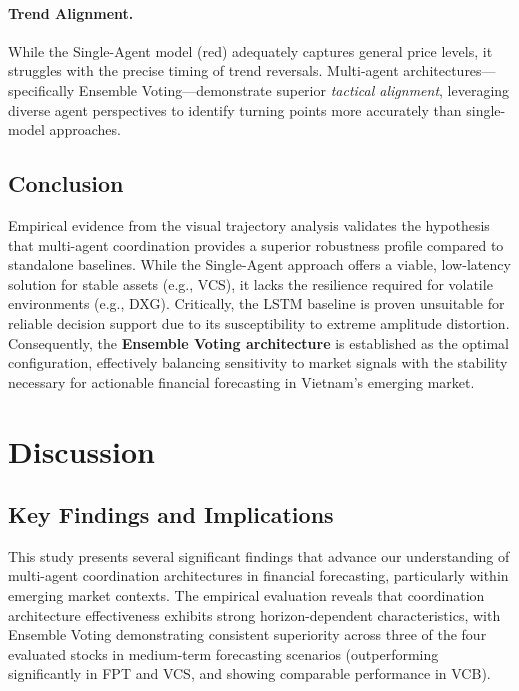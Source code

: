\documentclass{ieeeaccess}
\begin{document}
\paragraph{Trend Alignment.}
While the Single-Agent model (red) adequately captures general price levels, it struggles with the precise timing of trend reversals. Multi-agent architectures—specifically Ensemble Voting—demonstrate superior \textit{tactical alignment}, leveraging diverse agent perspectives to identify turning points more accurately than single-model approaches.

\subsection{Conclusion}
Empirical evidence from the visual trajectory analysis validates the hypothesis that multi-agent coordination provides a superior robustness profile compared to standalone baselines. While the Single-Agent approach offers a viable, low-latency solution for stable assets (e.g., VCS), it lacks the resilience required for volatile environments (e.g., DXG). Critically, the LSTM baseline is proven unsuitable for reliable decision support due to its susceptibility to extreme amplitude distortion. Consequently, the \textbf{Ensemble Voting architecture} is established as the optimal configuration, effectively balancing sensitivity to market signals with the stability necessary for actionable financial forecasting in Vietnam's emerging market.

\section{Discussion}
\subsection{Key Findings and Implications}
This study presents several significant findings that advance our understanding of multi-agent coordination architectures in financial forecasting, particularly within emerging market contexts. The empirical evaluation reveals that coordination architecture effectiveness exhibits strong horizon-dependent characteristics, with Ensemble Voting demonstrating consistent superiority across three of the four evaluated stocks in medium-term forecasting scenarios (outperforming significantly in FPT and VCS, and showing comparable performance in VCB).
\end{document}
